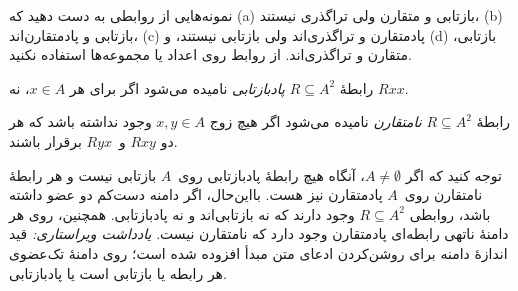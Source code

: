 \documentclass[../../../include/open-logic-section]{subfiles}
\begin{document}
\begin{prob}
نمونه‌هایی از روابطی به دست دهید که (a) بازتابی و متقارن ولی
تراگذری نیستند، (b) بازتابی و پادمتقارن‌اند، (c) پادمتقارن و تراگذری‌اند
ولی بازتابی نیستند، و (d) بازتابی، متقارن و تراگذری‌اند. از روابط روی اعداد
یا مجموعه‌ها استفاده نکنید.
\end{prob}

\begin{defn}
رابطهٔ $R \subseteq A^2$ \emph{پادبازتابی} نامیده می‌شود اگر برای هر $x \in
A$، نه $Rxx$.
\end{defn}

\begin{defn}[نامتقارنی]
رابطهٔ $R \subseteq A^2$ \emph{نامتقارن} نامیده می‌شود اگر هیچ زوج $x,y\in
A$ وجود نداشته باشد که هر دو $Rxy$ و~$Ryx$ برقرار باشند.
\end{defn}

توجه کنید که اگر $A \neq \emptyset$، آنگاه هیچ رابطهٔ پادبازتابی
روی~$A$ بازتابی نیست و هر رابطهٔ نامتقارن روی~$A$ پادمتقارن نیز هست.
بااین‌حال، اگر دامنه دست‌کم دو عضو داشته باشد، روابطی $R \subseteq A^2$
وجود دارند که نه بازتابی‌اند و نه پادبازتابی. همچنین، روی هر دامنهٔ
ناتهی رابطه‌ای پادمتقارن وجود دارد که نامتقارن نیست.
\emph{یادداشت ویراستاری:} قید اندازهٔ دامنه برای روشن‌کردن ادعای متن مبدأ
افزوده شده است؛ روی دامنهٔ تک‌عضوی هر رابطه یا بازتابی است یا پادبازتابی.
\end{document}
